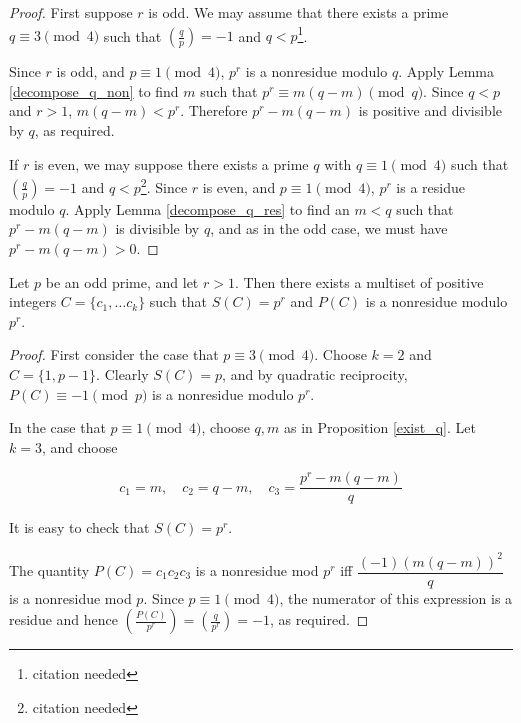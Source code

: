\documentclass{article}
\begin{document}
\begin{proof}
  First suppose $r$ is odd. We may assume that there exists a prime
  $q \equiv 3 \pmod 4$ such that $\left( \frac{q}{p} \right) = -1$
  and $q < p$\footnote{citation needed}. 

  Since $r$ is odd, and $p \equiv 1 \pmod 4$, $p^r$ is a nonresidue
  modulo $q$. Apply Lemma \ref{decompose_q_non} to find $m$ such
  that $p^r \equiv m(q-m) \pmod q$. Since $q < p$ and $r > 1$,
  $m(q-m) < p^r$. Therefore $p^r - m(q-m)$ is positive and divisible
  by $q$, as required.

  If $r$ is even, we may suppose there exists a prime $q$ with $q
  \equiv 1 \pmod 4$ such that $\left( \frac{q}{p} \right) = -1$ and $q
  < p$\footnote{citation needed}. Since $r$ is even, and $p \equiv 1
  \pmod 4$, $p^r$ is a residue modulo $q$. Apply Lemma
  \ref{decompose_q_res} to find an $m < q$ such that $p^r - m(q-m)$ is
  divisible by $q$, and as in the odd case, we must have $p^r - m(q-m)
  > 0$.
\end{proof}
\begin{thm}
  \label{exist_decomp}
  Let $p$ be an odd prime, and let $r > 1$. Then there exists a
  multiset of positive integers $C = \{c_1, \ldots c_k\}$ such that
  $S(C) = p^r$ and $P(C)$ is a nonresidue modulo $p^r$.
\end{thm}
\begin{proof}
  First consider the case that $p \equiv 3 \pmod 4$. Choose $k = 2$
  and $C = \{1, p-1\}$. Clearly $S(C) = p$, and by quadratic
  reciprocity, $P(C) \equiv -1 \pmod p$ is a nonresidue modulo $p^r$.

  In the case that $p \equiv 1 \pmod 4$, choose $q,m$ as in
  Proposition \ref{exist_q}. Let $k=3$, and choose 

  \[c_1 = m, \quad c_2 =  q-m, \quad c_3 = \frac{p^r - m(q-m)}{q}\]

  It is easy to check that $S(C) = p^r$.

  The quantity $P(C) = c_1c_2c_3$ is a nonresidue mod $p^r$ iff
  $\dfrac{(-1)(m(q-m))^2}{q}$ is a nonresidue mod $p$. Since $p \equiv
  1 \pmod 4$, the numerator of this expression is a residue and hence
  $\left( \frac{P(C)}{p^r} \right) = \left( \frac{q}{p^r} \right) =
  -1$, as required.
\end{proof}
\end{document}
